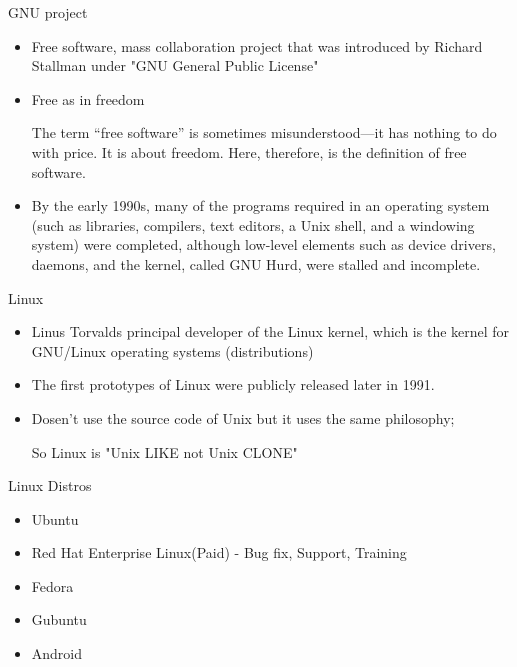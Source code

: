 \begin{frame}[t]{GNU project}
	\begin{itemize}
		\item Free software, mass collaboration project that was introduced by Richard Stallman under "GNU General Public License"
		
		\item Free as in freedom

		The term “free software” is sometimes misunderstood—it has nothing to do with price. It is about freedom. Here, therefore, is the definition of free software.
		
		\item By the early 1990s, many of the programs required in an operating system (such as libraries, compilers, text editors, a Unix shell, and a windowing system) were completed, although low-level elements such as device drivers, daemons, and the kernel, called GNU Hurd, were stalled and incomplete.
		
	\end{itemize}
\end{frame}
\begin{frame}[t]{Linux}
	\begin{itemize}
		\item Linus Torvalds principal developer of the Linux kernel, which is the kernel for GNU/Linux operating systems (distributions)
		
		\item The first prototypes of Linux were publicly released later in 1991.
		\item Dosen't use the source code of Unix but it uses the same philosophy;
		
		So Linux is "Unix LIKE not Unix CLONE"
		
	\end{itemize}
\end{frame}
\begin{frame}[t]{Linux Distros}
	\begin{itemize}
		\item Ubuntu 
		\item Red Hat Enterprise Linux(Paid) - Bug fix, Support, Training
		\item Fedora
		\item Gubuntu
		\item Android
		
	\end{itemize}
\end{frame}

